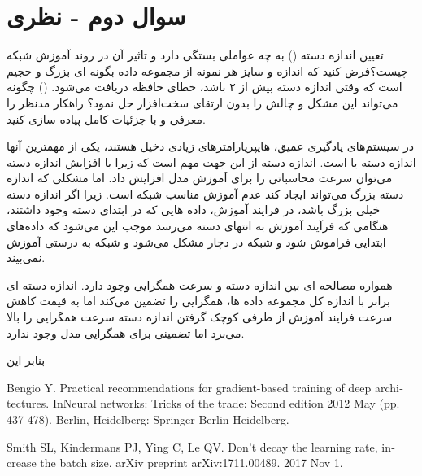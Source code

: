 \section{سوال دوم - نظری}
تعیین اندازه دسته () به چه عواملی بستگی دارد و تاثیر آن در روند آموزش شبکه چیست؟فرض کنید که اندازه و سایز هر نمونه از مجموعه داده بگونه ای بزرگ و حجیم است که وقتی اندازه دسته بیش از ۲ باشد، خطای حافظه دریافت می‌شود. () چگونه می‌تواند این مشکل و چالش را بدون ارتقای سخت‌افزار حل نمود؟ راهکار مدنظر را معرفی و با جزئیات کامل پیاده سازی کنید.







\begin{qsolve}
	در سیستم‌های یادگیری عمیق، هایپرپارامتر‌های زیادی دخیل هستند، یکی از مهمترین آنها اندازه دسته یا  است. \cite{ref1} اندازه دسته از این جهت مهم است که زیرا با افزایش اندازه دسته می‌توان سرعت محاسباتی را برای آموزش مدل افزایش داد. اما مشکلی که اندازه دسته بزرگ می‌تواند ایجاد کند عدم آموزش مناسب شبکه است. زیرا اگر اندازه دسته خیلی بزرگ باشد، در فرایند آموزش، داده هایی که در ابتدای دسته وجود داشتند، هنگامی که فرآیند آموزش به انتهای دسته می‌رسد موجب این می‌شود که داده‌های ابتدایی فراموش شود و شبکه در  دچار مشکل می‌شود و شبکه به درستی آموزش نمی‌بیند.
	
همواره مصالحه ای بین اندازه دسته و سرعت همگرایی وجود دارد. اندازه دسته ای برابر با اندازه کل مجموعه داده ها، همگرایی را تضمین می‌کند اما به قیمت کاهش سرعت فرایند آموزش از طرفی کوچک گرفتن اندازه دسته سرعت همگرایی را بالا می‌برد اما تضمینی برای همگرایی مدل وجود ندارد.

بنابر این 
	
	\begin{latin}
		\begin{thebibliography}{9}
			Bengio Y. Practical recommendations for gradient-based training of deep architectures. InNeural networks: Tricks of the trade: Second edition 2012 May (pp. 437-478). Berlin, Heidelberg: Springer Berlin Heidelberg.
			
			
			Smith SL, Kindermans PJ, Ying C, Le QV. Don't decay the learning rate, increase the batch size. arXiv preprint arXiv:1711.00489. 2017 Nov 1.
			
		\end{thebibliography} 
	\end{latin}
	

	
\end{qsolve}





























